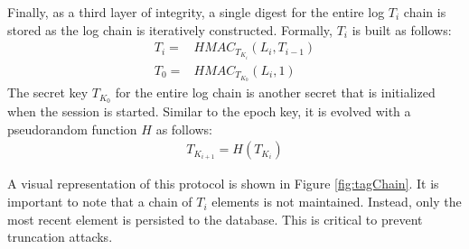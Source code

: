 \documentclass{sig-alternate}
\begin{document}
Finally, as a third layer of integrity, a single digest for the entire log $T_i$
chain is stored as the log chain is iteratively constructed. Formally, $T_i$ is
built as follows:
\begin{align*}
T_i = & HMAC_{T_{K_{i}}}(L_{i}, T_{i - 1}) \\
T_0 = & HMAC_{T_{K_{0}}}(L_{i}, 1) %
\end{align*}
The secret key $T_{K_{0}}$ for the entire log chain is another secret that is
initialized when the session is started. Similar to the epoch key, it is evolved
with a pseudorandom function $H$ as follows:
\begin{align*}
T_{K_{i + 1}} = H(T_{K_{i}})
\end{align*}

A visual representation of this protocol is shown in Figure \ref{fig:tagChain}. It is
important to note that a chain of $T_i$ elements is not maintained. Instead, only the
most recent element is persisted to the database. This is critical to prevent
truncation attacks.

\end{document}
